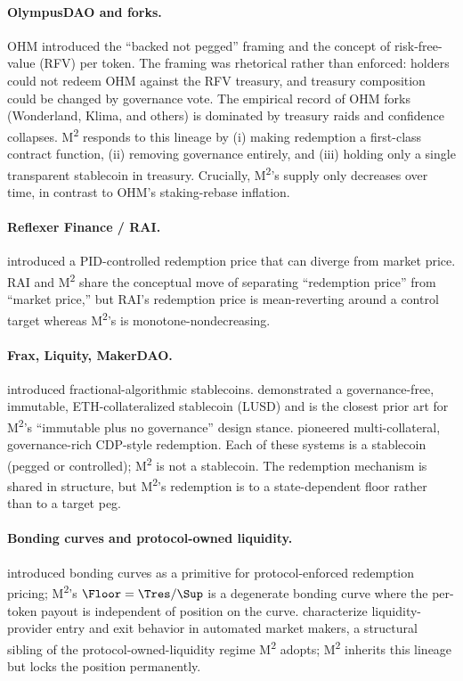 \paragraph{OlympusDAO and forks.} OHM \citep{OlympusDAO2021} introduced the ``backed not pegged'' framing and the concept of risk-free-value (RFV) per token. The framing was rhetorical rather than enforced: holders could not redeem OHM against the RFV treasury, and treasury composition could be changed by governance vote. The empirical record of OHM forks (Wonderland, Klima, and others) is dominated by treasury raids and confidence collapses. M\textsuperscript{2} responds to this lineage by (i) making redemption a first-class contract function, (ii) removing governance entirely, and (iii) holding only a single transparent stablecoin in treasury. Crucially, M\textsuperscript{2}'s supply only decreases over time, in contrast to OHM's staking-rebase inflation.

\paragraph{Reflexer Finance / RAI.} \citet{Reflexer2021} introduced a PID-controlled redemption price that can diverge from market price. RAI and M\textsuperscript{2} share the conceptual move of separating ``redemption price'' from ``market price,'' but RAI's redemption price is mean-reverting around a control target whereas M\textsuperscript{2}'s is monotone-nondecreasing.

\paragraph{Frax, Liquity, MakerDAO.} \citet{Frax2021} introduced fractional-algorithmic stablecoins. \citet{Liquity2021} demonstrated a governance-free, immutable, ETH-collateralized stablecoin (LUSD) and is the closest prior art for M\textsuperscript{2}'s ``immutable plus no governance'' design stance. \citet{Maker2019} pioneered multi-collateral, governance-rich CDP-style redemption. Each of these systems is a stablecoin (pegged or controlled); M\textsuperscript{2} is not a stablecoin. The redemption mechanism is shared in structure, but M\textsuperscript{2}'s redemption is to a state-dependent floor rather than to a target peg.

\paragraph{Bonding curves and protocol-owned liquidity.} \citet{Bancor2017} introduced bonding curves as a primitive for protocol-enforced redemption pricing; M\textsuperscript{2}'s $\Floor = \Tres/\Sup$ is a degenerate bonding curve where the per-token payout is independent of position on the curve. \citet{Heimbach2022} characterize liquidity-provider entry and exit behavior in automated market makers, a structural sibling of the protocol-owned-liquidity regime M\textsuperscript{2} adopts; M\textsuperscript{2} inherits this lineage but locks the position permanently.


